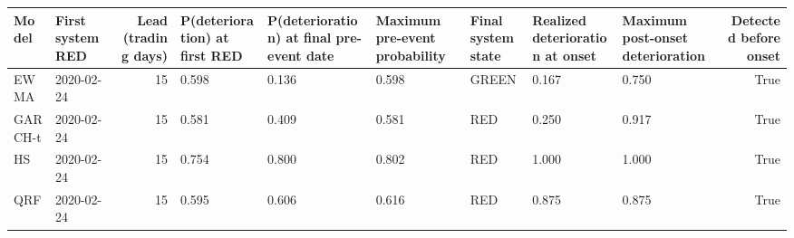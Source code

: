 \begin{tabular}{llrllllllr}
\toprule
Model & First system RED & Lead (trading days) & P(deterioration) at first RED & P(deterioration) at final pre-event date & Maximum pre-event probability & Final system state & Realized deterioration at onset & Maximum post-onset deterioration & Detected before onset \\
\midrule
EWMA & 2020-02-24 & 15 & 0.598 & 0.136 & 0.598 & GREEN & 0.167 & 0.750 & True \\
GARCH-t & 2020-02-24 & 15 & 0.581 & 0.409 & 0.581 & RED & 0.250 & 0.917 & True \\
HS & 2020-02-24 & 15 & 0.754 & 0.800 & 0.802 & RED & 1.000 & 1.000 & True \\
QRF & 2020-02-24 & 15 & 0.595 & 0.606 & 0.616 & RED & 0.875 & 0.875 & True \\
\bottomrule
\end{tabular}
